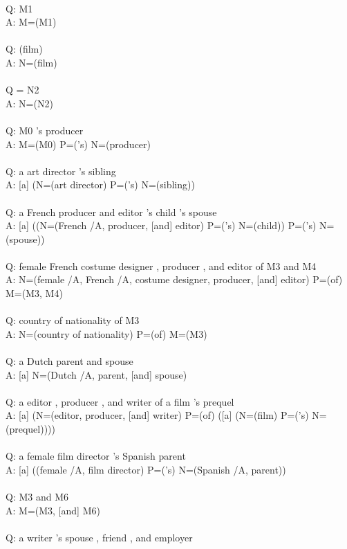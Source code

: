 \documentclass{article} \usepackage{iclr2022_conference,times}
\newcommand{\prompt}[1]{{\footnotesize \textsf{#1}}}
\begin{document}
\prompt{\\
Q: M1 \\
A: M=(M1) \\
 \\
Q: (film) \\
A: N=(film) \\
 \\
Q = N2 \\
A: N=(N2) \\
 \\
Q: M0 's producer \\
A: M=(M0) P=('s) N=(producer) \\
 \\
Q: a art director 's sibling \\
A: [a] (N=(art director) P=('s) N=(sibling)) \\
 \\
Q: a French producer and editor 's child 's spouse \\
A: [a] ((N=(French /A, producer, [and] editor) P=('s) N=(child)) P=('s) N=(spouse)) \\
 \\
Q: female French costume designer , producer , and editor of M3 and M4 \\
A: N=(female /A, French /A, costume designer, producer, [and] editor) P=(of) M=(M3, M4) \\
 \\
Q: country of nationality of M3 \\
A: N=(country of nationality) P=(of) M=(M3) \\
 \\
Q: a Dutch parent and spouse \\
A: [a] N=(Dutch /A, parent, [and] spouse) \\
 \\
Q: a editor , producer , and writer of a film 's prequel \\
A: [a] (N=(editor, producer, [and] writer) P=(of) ([a] (N=(film) P=('s) N=(prequel)))) \\
 \\
Q: a female film director 's Spanish parent \\
A: [a] ((female /A, film director) P=('s) N=(Spanish /A, parent)) \\
 \\
Q: M3 and M6 \\
A: M=(M3, [and] M6) \\
 \\
Q: a writer 's spouse , friend , and employer \\
}
\end{document}
